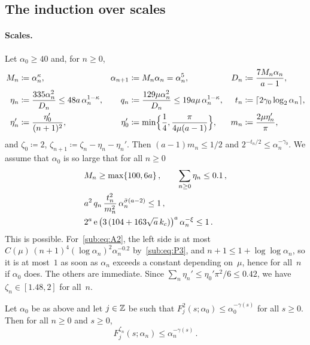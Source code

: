 \documentclass[11pt,letterpaper]{article}
\begin{document}
\subsection{The induction over scales}
\label{sub:sec:induction}

\paragraph{Scales.} Let $\alpha_0\ge40$ and, for $n\ge0$,
\begin{align*}
  M_n&\coloneqq\alpha_n^{\kappa},&\alpha_{n+1}&\coloneqq M_n\alpha_n=\alpha_n^{5},&D_n&\coloneqq\frac{7M_n\alpha_n}{a-1},\\
  \eta_n&\coloneqq\frac{335\alpha_n^2}{D_n}\le48a\,\alpha_n^{1-\kappa},&q_n&\coloneqq\frac{129\mu\alpha_n^2}{D_n}\le19a\mu\,\alpha_n^{1-\kappa},&t_n&\coloneqq\lceil2\gamma_0\log_2\alpha_n\rceil,\\
  \eta_n'&\coloneqq\frac{\eta_0'}{(n+1)^2},&\eta_0'&\coloneqq\min\Bigl\{\frac14,\frac{\pi}{4\mu(a-1)}\Bigr\},&m_n&\coloneqq\frac{2\mu\eta_n'}{\pi},
\end{align*}
and $\zeta_0\coloneqq2$, $\zeta_{n+1}\coloneqq \zeta_n-\eta_n-\eta_n'$. Then $(a-1)m_n\le1/2$ and $2^{-t_n/2}\le\alpha_n^{-\gamma_0}$. We assume that $\alpha_0$ is so large that for all $n\ge0$
\begin{align}
\label{sub:eq:A1}
  &M_n\ge\max\{100,6a\}\,,\qquad\sum_{n\ge0}\eta_n\le0.1\,,\\
\label{sub:eq:A2}
  &a^2\,q_n\,\frac{t_n^2}{m_n^2}\,\alpha_n^{\bar\sigma(a-2)}\le1\,,\\
\label{sub:eq:A3}
  &2^a\,\mathrm{e}\,\bigl(3\,(104+163\sqrt a\,k_c)\bigr)^a\,\alpha_n^{-\xi}\le1\,.
\end{align}
This is possible. For~\eqref{sub:eq:A2}, the left side is at most $C(\mu)\,(n+1)^4(\log\alpha_n)^2\alpha_n^{-0.2}$ by~\eqref{sub:eq:P3}, and $n+1\le1+\log\log\alpha_n$, so it is at most~$1$ as soon as $\alpha_n$ exceeds a constant depending on~$\mu$, hence for all~$n$ if $\alpha_0$ does. The others are immediate. Since $\sum_n\eta_n'\le\eta_0'\pi^2/6\le0.42$, we have $\zeta_n\in[1.48,2]$ for all~$n$.

\begin{theorem}[Induction]
\label{sub:thm:induction}
Let $\alpha_0$ be as above and let $j\in\mathbb Z$ be such that $F_j^{2}(s;\alpha_0)\le\alpha_0^{-\gamma(s)}$ for all $s\ge0$. Then for all $n\ge0$ and $s\ge0$,
\begin{equation}
\label{sub:eq:hyp}
  F_j^{\zeta_n}(s;\alpha_n)\le\alpha_n^{-\gamma(s)}\,.
\end{equation}
\end{theorem}
\end{document}
